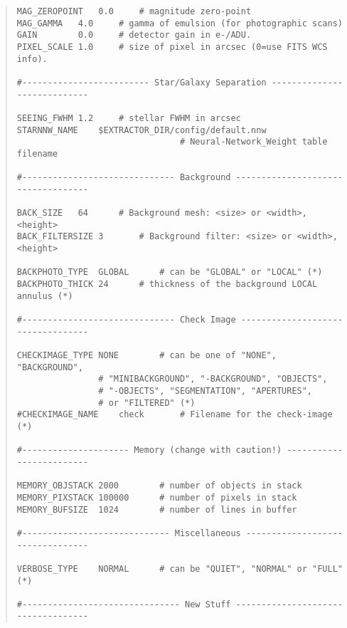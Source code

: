 \documentclass[twoside,11pt]{article}
\renewcommand{\_}{\texttt{\symbol{95}}}
\begin{document}
\begin{quote}
\begin{verbatim}
MAG_ZEROPOINT	0.0		# magnitude zero-point
MAG_GAMMA	4.0		# gamma of emulsion (for photographic scans)
GAIN		0.0		# detector gain in e-/ADU.
PIXEL_SCALE	1.0		# size of pixel in arcsec (0=use FITS WCS info).

#------------------------- Star/Galaxy Separation ----------------------------

SEEING_FWHM	1.2		# stellar FWHM in arcsec
STARNNW_NAME	$EXTRACTOR_DIR/config/default.nnw	
                                # Neural-Network_Weight table filename

#------------------------------ Background -----------------------------------

BACK_SIZE	64		# Background mesh: <size> or <width>,<height>
BACK_FILTERSIZE	3		# Background filter: <size> or <width>,<height>

BACKPHOTO_TYPE	GLOBAL		# can be "GLOBAL" or "LOCAL" (*)
BACKPHOTO_THICK	24		# thickness of the background LOCAL annulus (*)

#------------------------------ Check Image ----------------------------------

CHECKIMAGE_TYPE	NONE		# can be one of "NONE", "BACKGROUND",
				# "MINIBACKGROUND", "-BACKGROUND", "OBJECTS",
				# "-OBJECTS", "SEGMENTATION", "APERTURES",
				# or "FILTERED" (*)
#CHECKIMAGE_NAME	check		# Filename for the check-image (*)

#--------------------- Memory (change with caution!) -------------------------

MEMORY_OBJSTACK	2000		# number of objects in stack
MEMORY_PIXSTACK	100000		# number of pixels in stack
MEMORY_BUFSIZE	1024		# number of lines in buffer

#----------------------------- Miscellaneous ---------------------------------

VERBOSE_TYPE	NORMAL		# can be "QUIET", "NORMAL" or "FULL" (*)

#------------------------------- New Stuff -----------------------------------
\end{verbatim}\end{quote}
\normalsize

\end{document}
